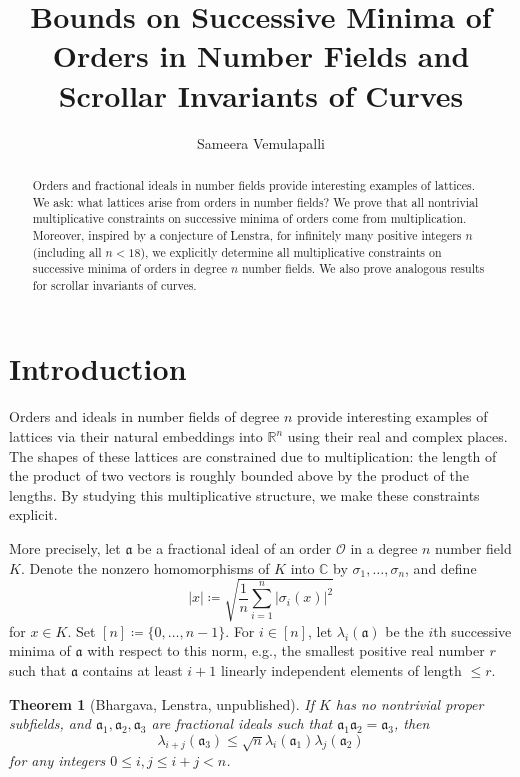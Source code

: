 \documentclass[letterpaper,10pt]{amsart}
\title{Bounds on Successive Minima of Orders in Number Fields and Scrollar Invariants of Curves}
\author{Sameera Vemulapalli}
\newcommand{\RR}{\mathbb{R}}      %
\newcommand{\cO}{\mathcal{O}}      %
\newcommand{\CC}{\mathbb{C}}      %
\newcommand{\mfa}{\mathfrak{a}}
\newtheorem{theorem}{Theorem}[section]
\theoremstyle{definition}
\theoremstyle{remark}
\begin{document}
\maketitle
{}

\begin{abstract}
Orders and fractional ideals in number fields provide interesting examples of lattices. We ask: what lattices arise from orders in number fields? We prove that all nontrivial  multiplicative constraints on successive minima of orders come from multiplication. Moreover, inspired by a conjecture of Lenstra, for infinitely many positive integers $n$ (including all $n < 18$), we explicitly determine all multiplicative constraints on successive minima of orders in degree $n$ number fields. We also prove analogous results for scrollar invariants of curves. 
\end{abstract}

\tableofcontents

\section{Introduction}
Orders and ideals in number fields of degree $n$ provide interesting examples of lattices via their natural embeddings into $\RR^n$ using their real and complex places. The shapes of these lattices are constrained due to multiplication: the length of the product of two vectors is roughly bounded above by the product of the lengths. By studying this multiplicative structure, we make these constraints explicit. 

More precisely, let $\mfa$ be a fractional ideal of an order $\cO$ in a degree $n$ number field $K$. Denote the nonzero homomorphisms of $K$ into $\CC$ by $\sigma_1,\dots,\sigma_{n}$, and define 
\[
	\lvert x \rvert \coloneqq \sqrt{\frac{1}{n}\sum_{i = 1}^{n} \lvert\sigma_i(x)\rvert^2}
\]
for $x \in K$. Set $[n] \coloneqq \{0,\dots,n-1\}$. For $i \in [n]$, let $\lambda_i(\mfa)$ be the $i$th successive minima of $\mfa$ with respect to this norm, e.g., the smallest positive real number $r$ such that $\mfa$ contains at least $i+1$ linearly independent elements of length $\leq r$. 

\begin{theorem}[Bhargava, Lenstra, unpublished]
\label{thm:bl}
If $K$ has no nontrivial proper subfields, and $\mfa_1,\mfa_2,\mfa_3$ are fractional ideals such that $\mfa_1\mfa_2 = \mfa_3$, then
\[
    \lambda_{i + j}(\mfa_3) \leq \sqrt{n} \lambda_i(\mfa_1)\lambda_j(\mfa_2)
\]
for any integers $0 \leq i,j \leq i + j < n$.
\end{theorem}
\end{document}
